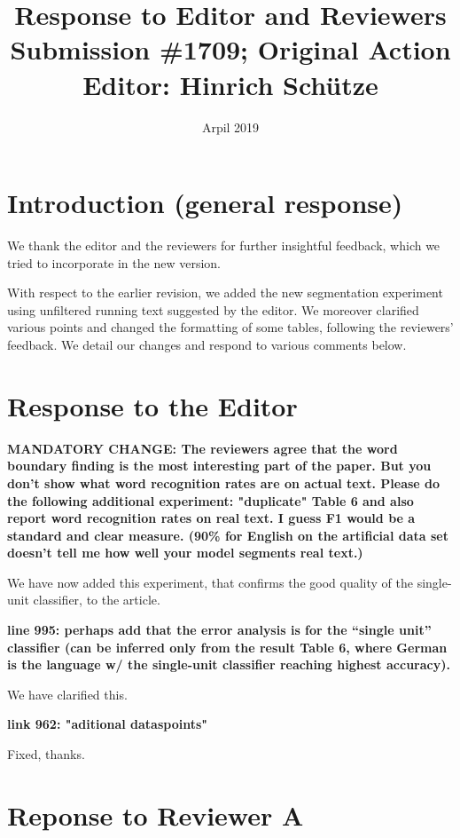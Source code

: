 \documentclass{article}[11pt,a4paper,oneside]
\title{Response to Editor and Reviewers \\ {\large Submission \#1709; Original Action Editor: Hinrich Sch{\"u}tze}}
\date{Arpil 2019}
\begin{document}
\maketitle


\section{Introduction (general response)}

We thank the editor and the reviewers for further insightful feedback, which we tried to incorporate in the new version.

With respect to the earlier revision, we added the new segmentation experiment using unfiltered running text suggested by the editor. We moreover clarified various points and changed the formatting of some tables, following the reviewers' feedback. We detail our changes and respond to various comments below.

\section{Response to the Editor}

\textbf{MANDATORY CHANGE: The reviewers agree that the word boundary
finding is the most interesting part of the paper. But you
don't show what word recognition rates are on actual
text.  Please do the following additional experiment:
"duplicate" Table 6 and also report word recognition rates
on real text. I guess F1 would be a standard and clear
measure. (90\% for English on the artificial data set doesn't
tell me how well your model segments real text.)}

We have now added this experiment, that confirms the good quality of the single-unit classifier, to the article.\newline

\textbf{line 995: perhaps add that the error analysis is for the
``single unit'' classifier (can be inferred only from the
result Table 6, where German is the language w/ the
single-unit classifier reaching highest accuracy).}

We have clarified this.\newline

\textbf{link 962: "aditional dataspoints"}

Fixed, thanks.

\section{Reponse to Reviewer A}
\end{document}
